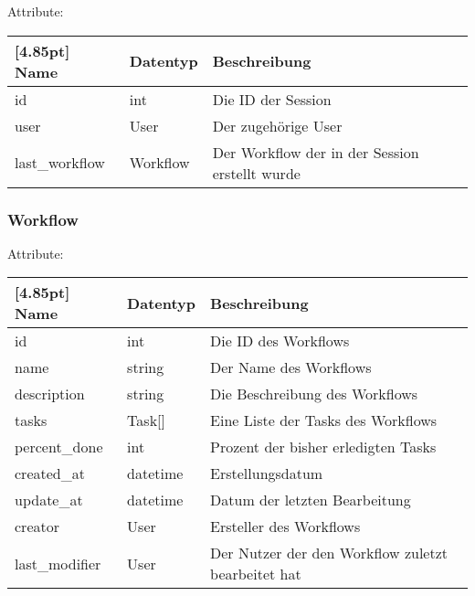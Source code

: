         Attribute:
		\begin{center}
        	\renewcommand{\arraystretch}{1.5}
            \setlength\tabcolsep{5pt}
        	\begin{tabularx}{\textwidth}{|l|l|X|}
        		\hline
                \rowcolor[gray]{0.75}[4.85pt]            		
        	    Name & Datentyp & Beschreibung \\ \hline
        	    id & int & Die ID der Session \\ \hline
        	    user & User & Der zugehörige User \\ \hline
        	    last_workflow & Workflow & Der Workflow der in der Session erstellt wurde \\ \hline
        	\end{tabularx}
        \end{center}
        
        \subsubsection{Workflow}
        
        Attribute:
		\begin{center}
        	\renewcommand{\arraystretch}{1.5}
            \setlength\tabcolsep{5pt}
        	\begin{tabularx}{\textwidth}{|l|l|X|}
        		\hline
                \rowcolor[gray]{0.75}[4.85pt]            		
        	    Name & Datentyp & Beschreibung \\ \hline
        	    id & int & Die ID des Workflows \\ \hline
        	    name & string & Der Name des Workflows \\ \hline
        	    description & string & Die Beschreibung des Workflows \\ \hline
        	    tasks & Task[] & Eine Liste der Tasks des Workflows \\ \hline
        	    percent_done & int & Prozent der bisher erledigten Tasks \\ \hline
        	    created_at & datetime & Erstellungsdatum \\ \hline
        	    update_at & datetime & Datum der letzten Bearbeitung\\ \hline
        	    creator & User & Ersteller des Workflows \\ \hline
        	    last_modifier & User & Der Nutzer der den Workflow zuletzt bearbeitet hat \\ \hline
        	\end{tabularx}
        \end{center}
		
